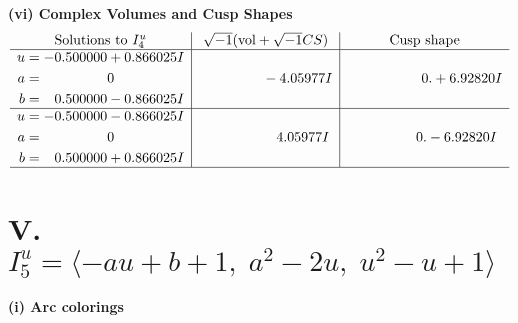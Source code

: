 \documentclass[1p]{elsarticle_modified}
\theoremstyle{definition}
\newcommand{\I}{\sqrt{-1}}
\begin{document}
\newpage\flushleft \textbf{(vi) Complex Volumes and Cusp Shapes}
$$\begin{array}{c|c|c}  
\text{Solutions to }I^u_{4}& \I (\text{vol} + \sqrt{-1}CS) & \text{Cusp shape}\\
 \hline 
\begin{aligned}
u &= -0.500000 + 0.866025 I \\
a &= \phantom{-0.000000 } 0 \\
b &= \phantom{-}0.500000 - 0.866025 I\end{aligned}
 & \phantom{-0.000000 } -4.05977 I & \phantom{-0.000000 -}0. + 6.92820 I \\ \hline\begin{aligned}
u &= -0.500000 - 0.866025 I \\
a &= \phantom{-0.000000 } 0 \\
b &= \phantom{-}0.500000 + 0.866025 I\end{aligned}
 & \phantom{-0.000000 -}4.05977 I & \phantom{-0.000000 } 0. - 6.92820 I\\
 \hline 
 \end{array}$$\newpage\newpage\renewcommand{\arraystretch}{1}
\centering \section*{V. $I^u_{5}= \langle - a u+b+1,\;a^2-2 u,\;u^2- u+1 \rangle$}
\flushleft \textbf{(i) Arc colorings}\\
\end{document}
